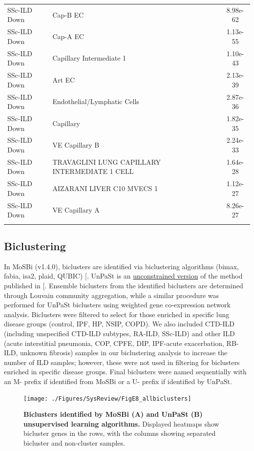 \documentclass[
]{article}
\begin{document}
\begin{singlespace}
\begin{longtable}[t]{>{\raggedright\arraybackslash}p{0.8in}>{\raggedright\arraybackslash}p{4.5in}c}
\addlinespace
SSc-ILD Down & Cap-B EC & 8.98e-62\\
SSc-ILD Down & Cap-A EC & 1.13e-55\\
SSc-ILD Down & Capillary Intermediate 1 & 1.10e-43\\
SSc-ILD Down & Art EC & 2.13e-39\\
SSc-ILD Down & Endothelial/Lymphatic Cells & 2.87e-36\\
\addlinespace
SSc-ILD Down & Capillary & 1.82e-35\\
SSc-ILD Down & VE Capillary B & 2.24e-33\\
SSc-ILD Down & TRAVAGLINI LUNG CAPILLARY INTERMEDIATE 1 CELL & 1.64e-28\\
SSc-ILD Down & AIZARANI LIVER C10 MVECS 1 & 1.12e-27\\
SSc-ILD Down & VE Capillary A & 8.26e-27\\*
\end{longtable}
\endgroup{}

\end{singlespace}

\subsection{Biclustering}\label{biclustering-1}

In MoSBi (v1.4.0), biclusters are identified via biclustering algorithms (bimax, fabia, isa2, plaid, QUBIC) {[}\citeproc{ref-rose_mosbi_2022}{52}{]}. UnPaSt is an \href{https://github.com/ozolotareva/UnPaSt}{unconstrained version} of the method published in {[}\citeproc{ref-zolotareva_identification_2021}{53}{]}. Ensemble biclusters from the identified biclusters are determined through Louvain community aggregation, while a similar procedure was performed for UnPaSt biclusters using weighted gene co-expression network analysis. Biclusters were filtered to select for those enriched in specific lung disease groups (control, IPF, HP, NSIP, COPD). We also included CTD-ILD (including unspecified CTD-ILD subtypes, RA-ILD, SSc-ILD) and other ILD (acute interstitial pneumonia, COP, CPFE, DIP, IPF-acute exacerbation, RB-ILD, unknown fibrosis) samples in our biclustering analysis to increase the number of ILD samples; however, these were not used in filtering for biclusters enriched in specific disease groups. Final biclusters were named sequentially with an M- prefix if identified from MoSBi or a U- prefix if identified by UnPaSt.



\begin{figure}

{\centering \texttt{[image: ./Figures/SysReview/FigE8\_allbiclusters]} 

}

\caption[All biclusters]{\textbf{Biclusters identified by MoSBi (A) and UnPaSt (B) unsupervised learning algorithms.} Displayed heatmaps show bicluster genes in the rows, with the columns showing separated bicluster and non-cluster samples.}\label{fig:biclusterall}
\end{figure}
\end{document}
